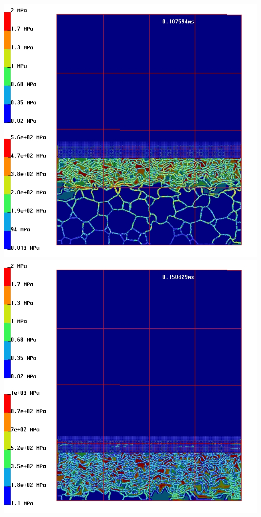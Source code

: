 \documentclass{beamer}
\begin{document}
\begin{frame}
{                      \hspace{12pt}
                      \includegraphics{FIGS/foamCrush40mm_v1_g_200ms_07.jpg}
                      \hspace{12pt}
                      \includegraphics{FIGS/foamCrush40mm_v1_g_200ms_09.jpg}}
    \end{frame}
\end{document}
